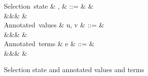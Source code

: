 \begin{figure}[H]
\begin{syntaxfig}
\mbox{Selection state}
&
\alpha, \beta
&
::=
&
\top
&
\\
&&&
\bot
&
\\[2mm]
\mbox{Annotated values}
&
u, v
&
::=
&
\hole \mid \annTrue{\alpha} \mid \annFalse{\alpha} \mid {} \mid \annNil{\alpha} \mid {} \mid
\\
&&&
  \mid {} \mid {} \mid {}
&
\text{}
\\[2mm]
\mbox{Annotated terms}
&
e
&
::=
&
\hole \mid \annTrue{\alpha} \mid \annFalse{\alpha} \mid {} \mid \annNil{\alpha} \mid {} \mid
\\
&&&
  \mid {}
&
\text{}
\\[2mm]
\end{syntaxfig}
\caption{Selection state and annotated values and terms}
\label{fig:core-syntax-selection}
\end{figure}
